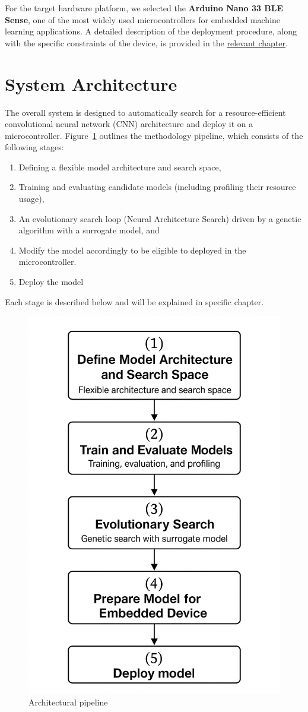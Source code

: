 For the target hardware platform, we selected the \textbf{Arduino Nano 33 BLE Sense}, one of the most widely used microcontrollers for embedded machine learning applications. A detailed description of the deployment procedure, along with the specific constraints of the device, is provided in the \hyperref[chap:DeploymentEnvironment]{relevant chapter}.


\section{System Architecture}

The overall system is designed to automatically search for a resource-efficient convolutional neural network (CNN) architecture and deploy it on a microcontroller. Figure~\ref{fig:architectural_pipeline} outlines the methodology pipeline, which consists of the following stages: 

\begin{enumerate}
    \item Defining a flexible model architecture and search space,
    \item Training and evaluating candidate models (including profiling their resource usage),
    \item An evolutionary search loop (Neural Architecture Search) driven by a genetic algorithm with a surrogate model, and
    \item Modify the model accordingly to be eligible to deployed in the microcontroller.
    \item Deploy the model
\end{enumerate}

Each stage is described below and will be explained in specific chapter.

\begin{figure}[H]
    \centering
    \includegraphics[width=0.6\linewidth]{Pictures/Architecture.png}
    \caption{Architectural pipeline}
    \label{fig:architectural_pipeline}
\end{figure}





